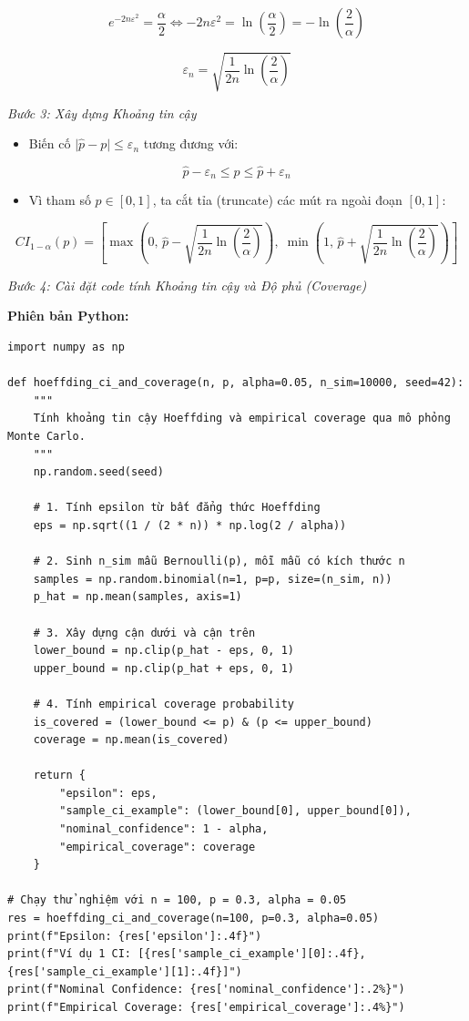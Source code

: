 \documentclass[12pt,a4paper]{article}
\begin{document}
\[e^{-2n\varepsilon^2} = \frac{\alpha}{2} \iff -2n\varepsilon^2 = \ln\left(\frac{\alpha}{2}\right) = -\ln\left(\frac{2}{\alpha}\right)\]

\[\varepsilon_n = \sqrt{\frac{1}{2n} \ln\left(\frac{2}{\alpha}\right)}\]

\emph{Bước 3: Xây dựng Khoảng tin cậy}

\begin{itemize}

\item
  Biến cố \(\vert{}\widehat{p} - p\vert{} \le \varepsilon_n\) tương đương với:
\end{itemize}

\[\widehat{p} - \varepsilon_n \le p \le \widehat{p} + \varepsilon_n\]

\begin{itemize}

\item
  Vì tham số \(p \in [0, 1]\), ta cắt tỉa (truncate) các mút ra ngoài đoạn \([0, 1]\):
\end{itemize}

\[CI_{1-\alpha}(p) = \left[ \max\left(0, \, \widehat{p} - \sqrt{\frac{1}{2n}\ln\left(\frac{2}{\alpha}\right)}\right), \; \min\left(1, \, \widehat{p} + \sqrt{\frac{1}{2n}\ln\left(\frac{2}{\alpha}\right)}\right) \right]\]

\emph{Bước 4: Cài đặt code tính Khoảng tin cậy và Độ phủ (Coverage)}

\textbf{Phiên bản Python:}

\begin{verbatim}
import numpy as np

def hoeffding_ci_and_coverage(n, p, alpha=0.05, n_sim=10000, seed=42):
    """
    Tính khoảng tin cậy Hoeffding và empirical coverage qua mô phỏng Monte Carlo.
    """
    np.random.seed(seed)
    
    # 1. Tính epsilon từ bất đẳng thức Hoeffding
    eps = np.sqrt((1 / (2 * n)) * np.log(2 / alpha))
    
    # 2. Sinh n_sim mẫu Bernoulli(p), mỗi mẫu có kích thước n
    samples = np.random.binomial(n=1, p=p, size=(n_sim, n))
    p_hat = np.mean(samples, axis=1)
    
    # 3. Xây dựng cận dưới và cận trên
    lower_bound = np.clip(p_hat - eps, 0, 1)
    upper_bound = np.clip(p_hat + eps, 0, 1)
    
    # 4. Tính empirical coverage probability
    is_covered = (lower_bound <= p) & (p <= upper_bound)
    coverage = np.mean(is_covered)
    
    return {
        "epsilon": eps,
        "sample_ci_example": (lower_bound[0], upper_bound[0]),
        "nominal_confidence": 1 - alpha,
        "empirical_coverage": coverage
    }

# Chạy thử nghiệm với n = 100, p = 0.3, alpha = 0.05
res = hoeffding_ci_and_coverage(n=100, p=0.3, alpha=0.05)
print(f"Epsilon: {res['epsilon']:.4f}")
print(f"Ví dụ 1 CI: [{res['sample_ci_example'][0]:.4f}, {res['sample_ci_example'][1]:.4f}]")
print(f"Nominal Confidence: {res['nominal_confidence']:.2%}")
print(f"Empirical Coverage: {res['empirical_coverage']:.4%}")
\end{verbatim}
\end{document}
